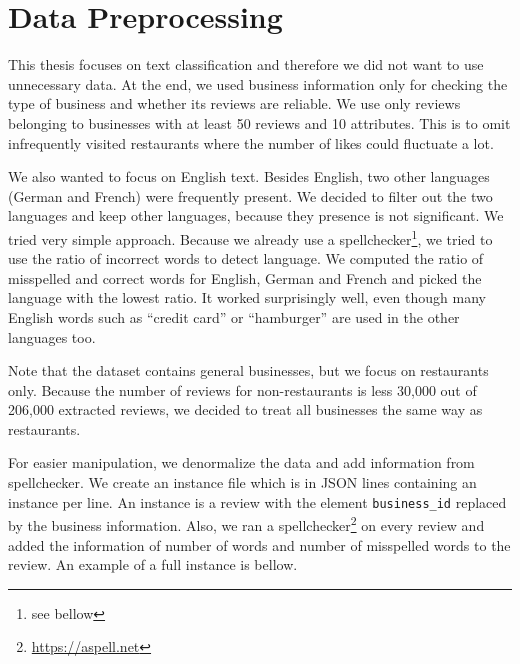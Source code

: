 \section{Data Preprocessing}

This thesis focuses on text classification and therefore we did not want to use unnecessary data.
At the end, we used business information only for checking the type of business and whether its reviews are reliable.
We use only reviews belonging to businesses with at least 50 reviews and 10 attributes.
This is to omit infrequently visited restaurants where the number of likes could fluctuate a lot.

We also wanted to focus on English text.
Besides English, two other languages (German and French) were frequently present.
We decided to filter out the two languages and keep other languages, because they presence is not significant.
We tried very simple approach.
Because we already use a spellchecker\footnote{see bellow}, we tried to use the ratio of incorrect words to detect language.
We computed the ratio of misspelled and correct words for English, German and French and picked the language with the lowest ratio.
It worked surprisingly well, even though many English words such as ``credit card'' or ``hamburger'' are used in the other languages too.

Note that the dataset contains general businesses, but we focus on restaurants only.
Because the number of reviews for non-restaurants is less 30,000 out of 206,000 extracted reviews,
we decided to treat all businesses the same way as restaurants.

For easier manipulation, we denormalize the data and add information from spellchecker.
We create an instance file which is in JSON lines containing an instance per line.
An instance is a review with the element \texttt{business\_id} replaced by the business information.
Also, we ran a spellchecker\footnote{\url{https://aspell.net}} on every review and added the information of number of words and number of misspelled words to the review.
An example of a full instance is bellow.

